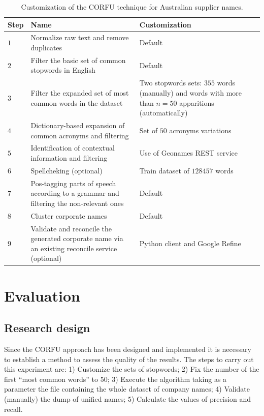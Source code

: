 \documentclass{llncs}
\begin{document}
\begin{table}[!htb]
\renewcommand{\arraystretch}{1.3}
\begin{center}
\begin{tabular}{|p{1cm}|p{6cm}|p{6cm}|}
\hline
  \textbf{Step} & \textbf{Name} & \textbf{Customization}  \\  \hline
  $1$ & Normalize raw text and remove duplicates & Default \\ \hline
  $2$ & Filter the basic set of common stopwords in English & Default\\ \hline
  $3$ & Filter the expanded set of most common words in the dataset & Two stopwords sets: $355$ words (manually) and words with more than $n=50 $ apparitions (automatically) \\ \hline
  $4$ & Dictionary-based expansion of common acronyms and filtering & Set of $50$ acronyms variations\\ \hline
  $5$ & Identification of contextual information and filtering & Use of Geonames REST service\\ \hline
  $6$ & Spellcheking (optional) & Train dataset of $128457$ words \\ \hline
  $7$ & Pos-tagging parts of speech according to a grammar and filtering the non-relevant ones & Default \\ \hline
  $8$ & Cluster corporate names & Default \\ \hline
  $9$ & Validate and reconcile the generated corporate name via an existing reconcile service (optional) & Python client and Google Refine \\ \hline
  \hline
  \end{tabular}
  \caption{Customization of the CORFU technique for Australian supplier names.}
  \label{config-corfu}
  \end{center}
\end{table} 

\section{Evaluation}

\subsection{Research design}
Since the CORFU approach has been designed and implemented it is necessary to 
establish a method to assess the quality of the results. The steps to carry 
out this experiment are: 1) Customize the sets of stopwords; 2) Fix the number 
of the first ``most common words'' to $50$; 3) Execute the algorithm taking 
as a parameter the file containing the whole dataset of company names; 4) 
Validate (manually) the dump of unified names; 5) Calculate the values of 
precision and recall.   
\end{document}
